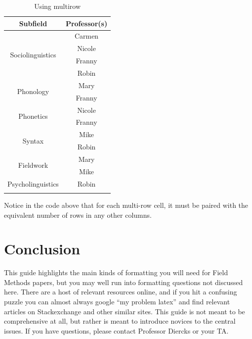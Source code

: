 \documentclass[output=paper,colorlinks,citecolor=brown]{langscibook}
\begin{document}
\begin{table} 

\caption{Using multirow{}{}{}}
\label{tab:diercks:multirow}

\begin{tabular}{ cc }
\lsptoprule %

 Subfield & Professor(s) \\
 \hline\hline
 \multirow{4}{1in}{Sociolinguistics} & Carmen \\ 
 & Nicole\\
 & Franny\\
 & Robin \\
 \hline
 \multirow{2}{1in}{Phonology} & Mary \\
 & Franny\\
 \hline
 \multirow{2}{1in}{Phonetics} & Nicole \\
 & Franny\\
 \hline
 \multirow{2}{1in}{Syntax} & Mike \\ 
 & Robin \\
 \hline
 \multirow{2}{1in}{Fieldwork} & Mary \\ 
 & Mike \\
 \hline
 Psycholinguistics & Robin\\
 \lspbottomrule %
\end{tabular}
\end{table} 

Notice in the code above that for each multi-row cell, it must be paired with the equivalent number of rows in any other columns. %

\section{Conclusion}

This guide highlights the main kinds of formatting you will need for Field Methods papers, but you may well run into formatting questions not discussed here. There are a host of relevant resources online, and if you hit a confusing puzzle you can almost always google ``my problem latex'' and find relevant articles on Stackexchange and other similar sites. This guide is not meant to be comprehensive at all, but rather is meant to introduce novices to the central issues. If you have questions, please contact Professor Diercks or your TA.
\end{document}
